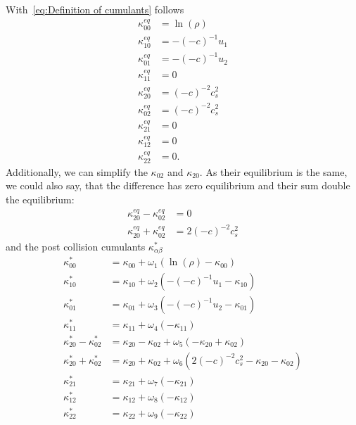 With~\eqref{eq:Definition of cumulants} follows
\begin{equation}
  \label{eq:equilibrium cumulants}
  \begin{aligned}
    \kappa_{00}^{eq} & = \ln(\rho) \\
    \kappa_{10}^{eq} & = - {(-c)}^{-1} u_1 \\
    \kappa_{01}^{eq} & = - {(-c)}^{-1} u_2 \\
    \kappa_{11}^{eq} & = 0 \\
    \kappa_{20}^{eq} & = {(-c)}^{-2} c_s^2  \\
    \kappa_{02}^{eq} & = {(-c)}^{-2} c_s^2  \\
    \kappa_{21}^{eq} & = 0 \\
    \kappa_{12}^{eq} & = 0 \\
    \kappa_{22}^{eq} & = 0.
  \end{aligned}
\end{equation}
Additionally, we can simplify the $\kappa_{02}$ and $\kappa_{20}$. As their equilibrium is the same, we could also say, that the difference has zero equilibrium and their sum double the equilibrium:
\begin{equation}
  \begin{aligned}
    \kappa_{20}^{eq} - \kappa_{02}^{eq} & = 0  \\
    \kappa_{20}^{eq} + \kappa_{02}^{eq} & = 2 {(-c)}^{-2} c_s^2
  \end{aligned}
\end{equation}
%
and the post collision cumulants $\kappa_{\alpha\beta}^*$
\begin{equation}
  \label{eq: post equilibrium cumulants}
  \begin{aligned}
    \kappa_{00}^{*} & = \kappa_{00} + \omega_1 \left( \ln(\rho) - \kappa_{00} \right) \\
    \kappa_{10}^{*} & = \kappa_{10} + \omega_2 \left( - {(-c)}^{-1} u_1 - \kappa_{10} \right) \\
    \kappa_{01}^{*} & = \kappa_{01} + \omega_3 \left( - {(-c)}^{-1} u_2 - \kappa_{01} \right) \\
    \kappa_{11}^{*} & = \kappa_{11} + \omega_4 \left( - \kappa_{11} \right) \\
    \kappa_{20}^{*} - \kappa_{02}^{*}
      & = \kappa_{20} - \kappa_{02} + \omega_5 \left( - \kappa_{20} + \kappa_{02} \right) \\
    \kappa_{20}^{*} + \kappa_{02}^{*}
      & = \kappa_{20} + \kappa_{02} + \omega_6 \left( 2 {(-c)}^{-2} c_s^2 - \kappa_{20} - \kappa_{02} \right) \\
    \kappa_{21}^{*} & = \kappa_{21} + \omega_7 \left( - \kappa_{21} \right) \\
    \kappa_{12}^{*} & = \kappa_{12} + \omega_8 \left( - \kappa_{12} \right) \\
    \kappa_{22}^{*} & = \kappa_{22} + \omega_9 \left( - \kappa_{22} \right)
  \end{aligned}
\end{equation}
